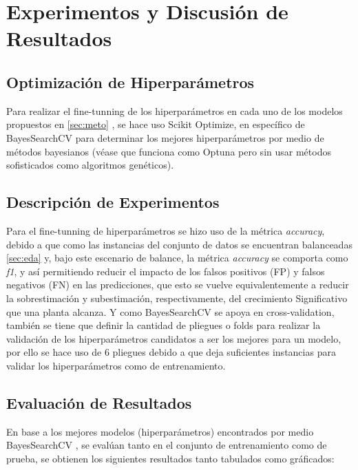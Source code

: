 \documentclass[12pt,a4paper]{article}
\begin{document}
    \section{Experimentos y Discusión de Resultados}\label{sec:exp}
    {
        \subsection{Optimización de Hiperparámetros}
        {            
            Para realizar el fine-tunning de los hiperparámetros en cada uno de los modelos 
            propuestos en \ref{sec:meto} , se hace uso Scikit Optimize, en 
            específico de BayesSearchCV \cite{skopt_bayes} para determinar los mejores hiperparámetros 
            por medio de métodos bayesianos (véase que funciona como Optuna \cite{optuna} pero 
            sin usar métodos sofisticados como algoritmos genéticos).
        }

        \subsection{Descripción de Experimentos}
        {
            Para el fine-tunning de hiperparámetros se hizo uso de la métrica \emph{accuracy}, debido 
            a que como las instancias del conjunto de datos se encuentran balanceadas \ref{sec:eda}  
            y, bajo este escenario de balance, la métrica \emph{accuracy} se comporta como \emph{f1}, 
            y así permitiendo reducir el impacto de los falsos positivos (FP) y falsos negativos (FN) en 
            las predicciones, que esto se vuelve equivalentemente a reducir la sobrestimación y 
            subestimación, respectivamente, del crecimiento Significativo que una planta alcanza. 
            Y como BayesSearchCV \cite{skopt_bayes} se apoya en cross-validation, también se tiene 
            que definir la cantidad de pliegues o folds para realizar la validación de los hiperparámetros 
            candidatos a ser los mejores para un modelo, por ello se hace uso de $6$ pliegues debido a 
            que deja suficientes instancias para validar los hiperparámetros como de entrenamiento.   
        }

        \subsection{Evaluación de Resultados}
        {
            En base a los mejores modelos (hiperparámetros) encontrados por medio BayesSearchCV \cite{skopt_bayes}, 
            se evalúan tanto en el conjunto de entrenamiento como de prueba, se obtienen los siguientes 
            resultados tanto tabulados como gráficados:
            
}}
\end{document}
